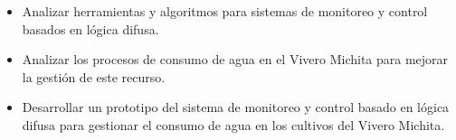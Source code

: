 \begin{itemize}
	\item Analizar herramientas y algoritmos para sistemas de monitoreo y control basados en lógica difusa.
    \item Analizar los procesos de consumo de agua en el Vivero Michita para mejorar la gestión de este recurso.
    \item Desarrollar un prototipo del sistema de monitoreo y control basado en lógica difusa para gestionar el consumo de agua en los cultivos del Vivero Michita.
\end{itemize}